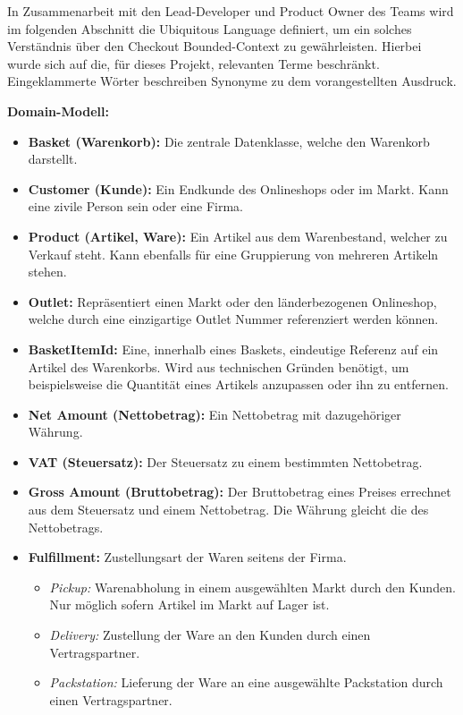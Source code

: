 In Zusammenarbeit mit den Lead-Developer und \Gls{Product Owner} des Teams wird im folgenden Abschnitt die Ubiquitous Language definiert, um ein solches Verständnis über den Checkout Bounded-Context zu gewährleisten. Hierbei wurde sich auf die, für dieses Projekt, relevanten Terme beschränkt. Eingeklammerte Wörter beschreiben Synonyme zu dem vorangestellten Ausdruck.

{\large \textbf{Domain-Modell:}}
\begin{itemize}[noitemsep,nolistsep]
	\item \textbf{Basket (Warenkorb): } {Die zentrale Datenklasse, welche den Warenkorb darstellt.}
	\item \textbf{Customer (Kunde): } {Ein Endkunde des Onlineshops oder im Markt. Kann eine zivile Person sein oder eine Firma.} %
	\item \textbf{Product (Artikel, Ware): } {Ein Artikel aus dem Warenbestand, welcher zu Verkauf steht. Kann ebenfalls für eine Gruppierung von mehreren Artikeln stehen.}
	\item \textbf{Outlet: } {Repräsentiert einen Markt oder den länderbezogenen Onlineshop, welche durch eine einzigartige Outlet Nummer referenziert werden können.}
	\item \textbf{BasketItemId: } {Eine, innerhalb eines Baskets, eindeutige Referenz auf ein Artikel des Warenkorbs. Wird aus technischen Gründen benötigt, um beispielsweise die Quantität eines Artikels anzupassen oder ihn zu entfernen.}
	\item \textbf{Net Amount (Nettobetrag): } {Ein Nettobetrag mit dazugehöriger Währung.} %
	\item \textbf{VAT (Steuersatz): } {Der Steuersatz zu einem bestimmten Nettobetrag.}
	\item \textbf{Gross Amount (Bruttobetrag): } {Der Bruttobetrag eines Preises errechnet aus dem Steuersatz und einem Nettobetrag. Die Währung gleicht die des Nettobetrags.}
	\item \textbf{Fulfillment: } {Zustellungsart der Waren seitens der Firma.}
	\begin{itemize}[noitemsep,nolistsep]
		\item \textit{Pickup: } {Warenabholung in einem ausgewählten Markt durch den Kunden. Nur möglich sofern Artikel im Markt auf Lager ist.}
		\item \textit{Delivery: } {Zustellung der Ware an den Kunden durch einen Vertragspartner.}
		\item \textit{Packstation: } {Lieferung der Ware an eine ausgewählte Packstation durch einen Vertragspartner.}
	\end{itemize}
\end{itemize}
\vspace{0.4em}

